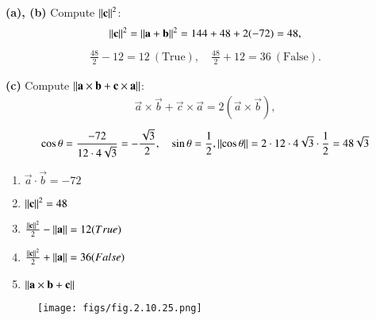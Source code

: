 \documentclass[journal]{IEEEtran}
\begin{document}
\textbf{(a), (b)} Compute $\left\lVert\mathbf c\right\rVert^2$:
\begin{align}
\left\lVert\mathbf c\right\rVert^2 = \left\lVert\mathbf a + \mathbf b\right\rVert^2 = 144 + 48 + 2(-72) = 48,
\end{align}
\begin{align}
\frac{48}{2} - 12 = 12\ (\text{True}),\quad \frac{48}{2} + 12 = 36\ (\text{False}).
\end{align}

\textbf{(c)} Compute $\left\lVert\mathbf a \times \mathbf b + \mathbf c \times \mathbf a\right\rVert$:
\begin{align}
\vec a \times \vec b + \vec c \times \vec a = 2(\vec a \times \vec b),
\end{align}
\begin{align}
\cos\theta = \frac{-72}{12 \cdot 4\sqrt{3}} = -\frac{\sqrt{3}}{2},\quad \sin\theta = \frac{1}{2},
\left\lVert\cos\theta\right\rVert = 2 \cdot 12 \cdot 4\sqrt{3} \cdot \frac{1}{2} = 48\sqrt{3}
\end{align}
\begin{enumerate}
    \item $\vec a \cdot \vec b = -72$
    \item $\left\lVert\mathbf c\right\rVert^2 = 48$
    \item $\frac{\left\lVert\mathbf c\right\rVert^2}{2} - \left\lVert\mathbf a\right\rVert = 12 (True)$
    \item $\frac{\left\lVert\mathbf c\right\rVert^2}{2} + \left\lVert\mathbf a\right\rVert = 36 (False)$
    \item $\left\lVert\mathbf a \times \mathbf b + \mathbf c\right\rVert$ 
\end{enumerate}
\begin{figure}[ht!]
    \centering
    \texttt{[image: figs/fig.2.10.25.png]}
    \caption{}
    \label{fig:1.2.27.jpg}
\end{figure}
\end{document}
